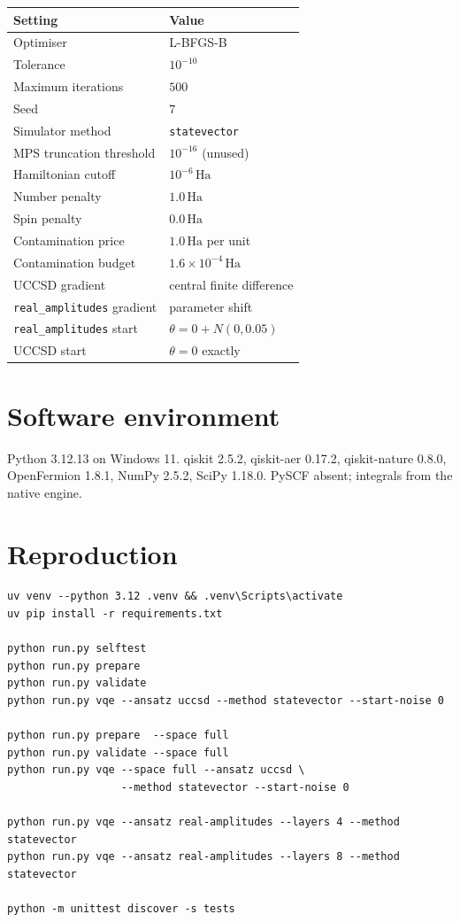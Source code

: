 \documentclass[11pt,a4paper]{article}
\newcommand{\Ha}{\ensuremath{\,\mathrm{Ha}}}
\newcommand{\code}[1]{\texttt{\small #1}}
\begin{document}
\begin{center}
\small
\begin{tabular}{ll}
\toprule
Setting & Value \\
\midrule
Optimiser                    & L-BFGS-B \\
Tolerance                    & $10^{-10}$ \\
Maximum iterations           & $500$ \\
Seed                         & $7$ \\
Simulator method             & \code{statevector} \\
MPS truncation threshold     & $10^{-16}$ (unused) \\
Hamiltonian cutoff           & $10^{-6}\Ha$ \\
Number penalty               & $1.0\Ha$ \\
Spin penalty                 & $0.0\Ha$ \\
Contamination price          & $1.0\Ha$ per unit \\
Contamination budget         & $1.6\times10^{-4}\Ha$ \\
UCCSD gradient               & central finite difference \\
\code{real\_amplitudes} gradient & parameter shift \\
\code{real\_amplitudes} start    & $\theta=0 + N(0,0.05)$ \\
UCCSD start                  & $\theta = 0$ exactly \\
\bottomrule
\end{tabular}
\end{center}

\section{Software environment}

Python 3.12.13 on Windows 11. qiskit 2.5.2, qiskit-aer 0.17.2, qiskit-nature
0.8.0, OpenFermion 1.8.1, NumPy 2.5.2, SciPy 1.18.0. PySCF absent; integrals
from the native engine.

\section{Reproduction}

\begin{verbatim}
uv venv --python 3.12 .venv && .venv\Scripts\activate
uv pip install -r requirements.txt

python run.py selftest
python run.py prepare
python run.py validate
python run.py vqe --ansatz uccsd --method statevector --start-noise 0

python run.py prepare  --space full
python run.py validate --space full
python run.py vqe --space full --ansatz uccsd \
                  --method statevector --start-noise 0

python run.py vqe --ansatz real-amplitudes --layers 4 --method statevector
python run.py vqe --ansatz real-amplitudes --layers 8 --method statevector

python -m unittest discover -s tests
\end{verbatim}
\end{document}
